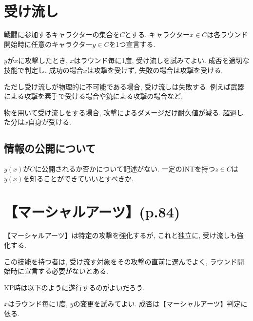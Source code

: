 \documentclass{jsarticle}
\begin{document}
\section{受け流し}
戦闘に参加するキャラクターの集合を$C$とする.
キャラクター$x\in C$は各ラウンド開始時に任意のキャラクター$y\in C$を1つ宣言する.

$y$が$x$に攻撃したとき,
$x$はラウンド毎に1度,
受け流しを試みてよい.
成否を適切な技能で判定し,
成功の場合$x$は攻撃を受けず,
失敗の場合は攻撃を受ける.

ただし受け流しが物理的に不可能である場合,
受け流しは失敗する.
例えば武器による攻撃を素手で受ける場合や銃による攻撃の場合など.

物を用いて受け流しをする場合,
攻撃によるダメージだけ耐久値が減る.
超過した分は$x$自身が受ける.

\subsection*{情報の公開について}
$y(x)$が$C$に公開されるか否かについて記述がない.
一定のINTを持つ$z\in C$は$y(x)$を知ることができていいとすべきか.

\section{【マーシャルアーツ】(p.84)}
【マーシャルアーツ】は特定の攻撃を強化するが,
これと独立に,
受け流しも強化する.

この技能を持つ者は,
受け流す対象をその攻撃の直前に選んでよく,
ラウンド開始時に宣言する必要がないとある.

KP時は以下のように遂行するのがよいだろう.

$x$はラウンド毎に1度,
$y$の変更を試みてよい.
成否は【マーシャルアーツ】判定に依る.



\end{document}
